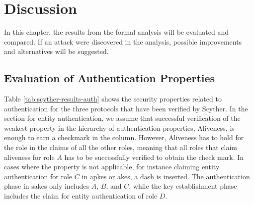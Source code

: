 \chapter{Discussion}
\label{chp:discussion}

In this chapter, the results from the formal analysis will be evaluated and compared. If an attack were discovered in the analysis, possible improvements and alternatives will be suggested.


\section{Evaluation of Authentication Properties}


Table \ref{tab:scyther-results-auth} shows the security properties related to authentication for the three protocols that have been verified by Scyther. In the section for entity authentication, we assume that successful verification of the weakest property in the hierarchy of authentication properties, Aliveness, is enough to earn a checkmark in the column. However, Aliveness has to hold for the role in the claims of all the other roles, meaning that all roles that claim aliveness for role $A$ has to be successfully verified to obtain the check mark. In cases where the property is not applicable, for instance claiming entity authentication for role $C$ in \gls{apkes} or \gls{akes}, a dash is inserted. The authentication phase in \gls{sakes} only includes $A$, $B$, and $C$, while the key establishment phase includes the claim for entity authentication of role $D$.

\begin{table}[h]
\centering
{}
\caption{Table of the security properties for authentication that are satisfied in the different protocols.}
\label{tab:scyther-results-auth}
\end{table}

